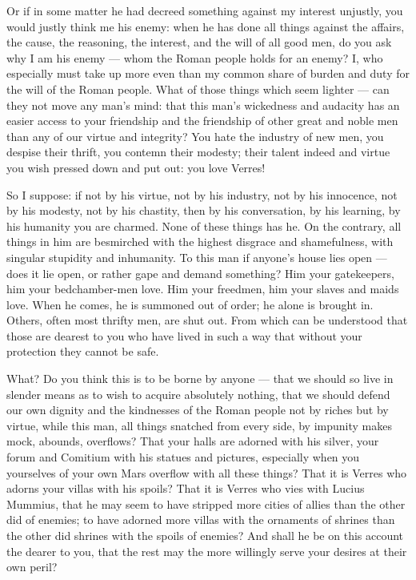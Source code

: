  Or if in some matter he had decreed something against my interest unjustly, you would justly think me his enemy: when he has done all things against the affairs, the cause, the reasoning, the interest, and the will of all good men, do you ask why I am his enemy --- whom the Roman people holds for an enemy? I, who especially must take up more even than my common share of burden and duty for the will of the Roman people. What of those things which seem lighter --- can they not move any man's mind: that this man's wickedness and audacity has an easier access to your friendship and the friendship of other great and noble men than any of our virtue and integrity? You hate the industry of new men, you despise their thrift, you contemn their modesty; their talent indeed and virtue you wish pressed down and put out: you love Verres!

 So I suppose: if not by his virtue, not by his industry, not by his innocence, not by his modesty, not by his chastity, then by his conversation, by his learning, by his humanity you are charmed. None of these things has he. On the contrary, all things in him are besmirched with the highest disgrace and shamefulness, with singular stupidity and inhumanity. To this man if anyone's house lies open --- does it lie open, or rather gape and demand something? Him your gatekeepers, him your bedchamber-men love. Him your freedmen, him your slaves and maids love. When he comes, he is summoned out of order; he alone is brought in. Others, often most thrifty men, are shut out. From which can be understood that those are dearest to you who have lived in such a way that without your protection they cannot be safe.

 What? Do you think this is to be borne by anyone --- that we should so live in slender means as to wish to acquire absolutely nothing, that we should defend our own dignity and the kindnesses of the Roman people not by riches but by virtue, while this man, all things snatched from every side, by impunity makes mock, abounds, overflows? That your halls are adorned with his silver, your forum and Comitium with his statues and pictures, especially when you yourselves of your own Mars overflow with all these things? That it is Verres who adorns your villas with his spoils? That it is Verres who vies with Lucius Mummius, that he may seem to have stripped more cities of allies than the other did of enemies; to have adorned more villas with the ornaments of shrines than the other did shrines with the spoils of enemies? And shall he be on this account the dearer to you, that the rest may the more willingly serve your desires at their own peril?

